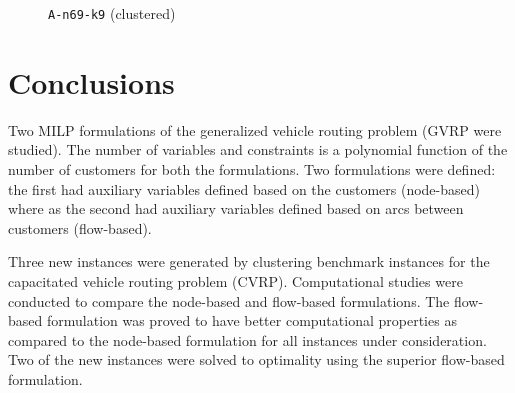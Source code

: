 \documentclass[letterpaper,12pt,onehalfspacing,twoside]{article}
\theoremstyle{msds}
\begin{document}
\begin{figure}[htbp]
\centering
{}
\quad
{}
\caption{\texttt{A-n69-k9} (clustered)}
\label{fig:A-n69-k9-sol}
\end{figure}

\section{Conclusions}
Two MILP formulations of the generalized vehicle routing problem (GVRP were studied). The number of variables and constraints is a polynomial function of the number of customers for both the formulations. 
Two formulations were defined: the first had auxiliary variables defined based on the customers (node-based) where as the second had auxiliary variables defined based on arcs between customers (flow-based). 

Three new instances were generated by clustering benchmark instances for the capacitated vehicle routing problem (CVRP). Computational studies were conducted to compare the node-based and flow-based formulations.
The flow-based formulation was proved to have better computational properties as compared to the node-based formulation for all instances under consideration. Two of the new instances were solved to optimality using the superior flow-based formulation. 
\end{document}
